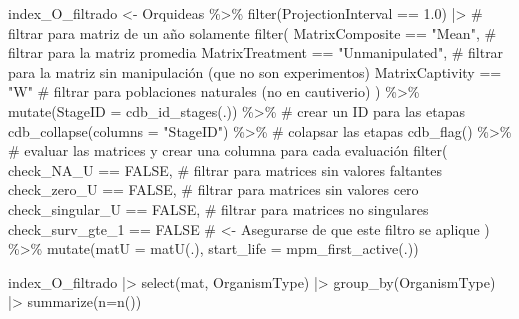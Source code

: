 \documentclass[
  12pt,
  letterpaper,
]{book}
\newenvironment{Shaded}{\begin{snugshade}}{\end{snugshade}}
\newcommand{\AttributeTok}[1]{\textcolor[rgb]{0.40,0.45,0.13}{#1}}
\newcommand{\CommentTok}[1]{\textcolor[rgb]{0.37,0.37,0.37}{#1}}
\newcommand{\ConstantTok}[1]{\textcolor[rgb]{0.56,0.35,0.01}{#1}}
\newcommand{\FloatTok}[1]{\textcolor[rgb]{0.68,0.00,0.00}{#1}}
\newcommand{\FunctionTok}[1]{\textcolor[rgb]{0.28,0.35,0.67}{#1}}
\newcommand{\NormalTok}[1]{\textcolor[rgb]{0.00,0.23,0.31}{#1}}
\newcommand{\OtherTok}[1]{\textcolor[rgb]{0.00,0.23,0.31}{#1}}
\newcommand{\SpecialCharTok}[1]{\textcolor[rgb]{0.37,0.37,0.37}{#1}}
\newcommand{\StringTok}[1]{\textcolor[rgb]{0.13,0.47,0.30}{#1}}
\begin{document}
\begin{Shaded}
\begin{Highlighting}[]
\NormalTok{index\_O\_filtrado }\OtherTok{\textless{}{-}}\NormalTok{ Orquideas }\SpecialCharTok{\%\textgreater{}\%}
  \FunctionTok{filter}\NormalTok{(ProjectionInterval }\SpecialCharTok{==} \FloatTok{1.0}\NormalTok{) }\SpecialCharTok{|\textgreater{}} \CommentTok{\# filtrar para matriz de un año solamente}
  \FunctionTok{filter}\NormalTok{(}
\NormalTok{    MatrixComposite }\SpecialCharTok{==} \StringTok{"Mean"}\NormalTok{, }\CommentTok{\# filtrar para la matriz promedia}
\NormalTok{    MatrixTreatment }\SpecialCharTok{==} \StringTok{"Unmanipulated"}\NormalTok{, }\CommentTok{\# filtrar para la matriz sin manipulación (que no son experimentos)}
\NormalTok{    MatrixCaptivity }\SpecialCharTok{==} \StringTok{"W"} \CommentTok{\# filtrar para poblaciones naturales (no en cautiverio)}
\NormalTok{  ) }\SpecialCharTok{\%\textgreater{}\%}
  \FunctionTok{mutate}\NormalTok{(}\AttributeTok{StageID =} \FunctionTok{cdb\_id\_stages}\NormalTok{(.)) }\SpecialCharTok{\%\textgreater{}\%} \CommentTok{\# crear un ID para las etapas}
  \FunctionTok{cdb\_collapse}\NormalTok{(}\AttributeTok{columns =} \StringTok{"StageID"}\NormalTok{) }\SpecialCharTok{\%\textgreater{}\%} \CommentTok{\# colapsar las etapas}
  \FunctionTok{cdb\_flag}\NormalTok{() }\SpecialCharTok{\%\textgreater{}\%} \CommentTok{\# evaluar las matrices y crear una columna para cada evaluación}
  \FunctionTok{filter}\NormalTok{(}
\NormalTok{    check\_NA\_U }\SpecialCharTok{==} \ConstantTok{FALSE}\NormalTok{, }\CommentTok{\# filtrar para matrices sin valores faltantes}
\NormalTok{    check\_zero\_U }\SpecialCharTok{==} \ConstantTok{FALSE}\NormalTok{, }\CommentTok{\# filtrar para matrices sin valores cero}
\NormalTok{    check\_singular\_U }\SpecialCharTok{==} \ConstantTok{FALSE}\NormalTok{, }\CommentTok{\# filtrar para matrices no singulares}
\NormalTok{    check\_surv\_gte\_1 }\SpecialCharTok{==} \ConstantTok{FALSE} \CommentTok{\# \textless{}{-} Asegurarse de que este filtro se aplique}
\NormalTok{  ) }\SpecialCharTok{\%\textgreater{}\%}
  \FunctionTok{mutate}\NormalTok{(}\AttributeTok{matU =} \FunctionTok{matU}\NormalTok{(.), }\AttributeTok{start\_life =} \FunctionTok{mpm\_first\_active}\NormalTok{(.))}

\NormalTok{index\_O\_filtrado }\SpecialCharTok{|\textgreater{}} \FunctionTok{select}\NormalTok{(mat, OrganismType) }\SpecialCharTok{|\textgreater{}} 
  \FunctionTok{group\_by}\NormalTok{(OrganismType) }\SpecialCharTok{|\textgreater{}} 
  \FunctionTok{summarize}\NormalTok{(}\AttributeTok{n=}\FunctionTok{n}\NormalTok{())}
\end{Highlighting}
\end{Shaded}
\end{document}
